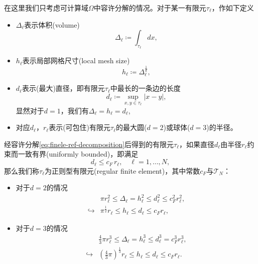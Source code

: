 在这里我们只考虑可计算域$\Omega$中容许分解的情况。对于某一有限元$\tau_{\ell}$，作如下定义
\begin{itemize}
  \item $\Delta_{\ell}$表示体积(volume)
  \begin{equation*}
    \Delta_{\ell} \coloneqq \int_{\tau_{\ell}} dx,
  \end{equation*}
  \item $h_{\ell}$表示局部网格尺寸(local mesh size)
  \begin{equation*}
    h_{\ell} \coloneqq \Delta_{\ell}^{\frac{1}{d}},
  \end{equation*}
  \item $d_{\ell}$表示(最大)直径，即有限元$\tau_{\ell}$中最长的一条边的长度
  \begin{equation*}
    d_{\ell} \coloneqq \sup_{x,y \in \tau_{\ell}}
    \left| x - y \right|,
  \end{equation*}
  显然对于$d=1$，我们有$\Delta_{\ell} = h_{\ell} = d_{\ell}$,
  \item 对应$d_{\ell}$，$r_{\ell}$表示(可包住)有限元$\tau_{\ell}$的最大圆($d=2$)或球体($d=3$)的半径。
\end{itemize}

经容许分解\eqref{eq:finele-ref-decomposition}后得到的有限元$\tau_{\ell}$，如果直径$d_{\ell}$由半径$r_{\ell}$约束而一致有界(uniformly bounded)，即满足
\begin{equation*}
  d_{\ell} \le c_{F} \, r_{\ell}, \quad \ell = 1,\ldots,N,
\end{equation*}
那么我们称$\tau_{\ell}$为正则型有限元(regular finite element)，其中常数$c_{F}$与$\mathcal{T}_{N}$：
\begin{itemize}
  \item 对于$d=2$的情况
  \begin{equation*}
    \begin{split}
      &\pi r_{\ell}^{2} \le \Delta_{\ell} = h_{\ell}^{2} \le d_{\ell}^{2} \le c_{F}^{2} r_{\ell}^{2}, \\
      \hookrightarrow &\pi^{\frac{1}{2}} r_{\ell} \le h_{\ell} \le d_{\ell} \le c_{F} r_{\ell},
    \end{split}
  \end{equation*}
  \item 对于$d=3$的情况
  \begin{equation*}
    \begin{split}
      &\frac{4}{3} \pi r_{\ell}^{3} \le \Delta_{\ell} = h_{\ell}^{3} \le d_{\ell}^{3} = c_{F}^{3} r_{\ell}^{3}, \\
      \hookrightarrow & \left( \frac{4}{3} \pi \right)^{\frac{1}{3}}
      r_{\ell} \le h_{\ell} \le d_{\ell} \le c_{F} r_{\ell}.
    \end{split}
  \end{equation*}
\end{itemize}

